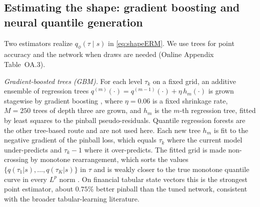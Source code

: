 \documentclass[11pt]{article}
\theoremstyle{remark}
\begin{document}
\medskip\noindent{}


\subsection{Estimating the shape: gradient boosting and neural quantile
generation}\label{sec:gbcmethod}

Two estimators realize $q_\phi(\tau\mid s)$ in \eqref{eq:shapeERM}. We
use trees for point accuracy and the network when draws are needed
(Online Appendix Table~OA.3).

\emph{Gradient-boosted trees (GBM).} For each level $\tau_k$ on a fixed grid, an additive ensemble of regression trees $q^{(m)}(\cdot) = q^{(m-1)}(\cdot) + \eta\, h_m(\cdot)$ is grown stagewise by gradient boosting \citep{friedman2001}, where $\eta=0.06$ is a fixed shrinkage rate, $M=250$ trees of depth three are grown, and $h_m$ is the $m$-th regression tree, fitted by least squares to the pinball pseudo-residuals. Quantile regression forests \citep{meinshausen2006} are the other tree-based route and are not used here. Each new tree $h_m$ is fit to the negative gradient of the pinball loss, which equals $\tau_k$ where the current model under-predicts and $\tau_k - 1$ where it over-predicts. The fitted grid is made non-crossing by monotone rearrangement, which sorts the values $\{q(\tau_1|s),\dots,q(\tau_K|s)\}$ in $\tau$ and is weakly closer to the true monotone quantile curve in every $L^p$ norm \citep{cherno2010rearr}. On financial tabular state
vectors this is the strongest point estimator, about $0.75\%$ better pinball than the tuned network, consistent with the broader
tabular-learning literature.
\end{document}
